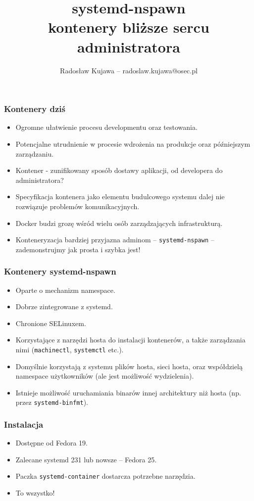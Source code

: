 \documentclass[dvipsnames,table]{beamer}
\title{systemd-nspawn \\ kontenery bliższe sercu administratora}
\author{Radosław Kujawa -- radoslaw.kujawa@osec.pl}
\institute{OSEC}
\begin{document}
\begin{frame}
	\titlepage
\end{frame}



\begin{frame}
\frametitle{Kontenery dziś}
\begin{itemize}
	\item Ogromne ułatwienie procesu developmentu oraz testowania.
	\item Potencjalne utrudnienie w procesie wdrożenia na produkcje oraz późniejszym zarządzaniu.
	\item Kontener - zunifikowany sposób dostawy aplikacji, od developera do administratora?
	\item Specyfikacja kontenera jako elementu budulcowego systemu dalej nie rozwiązuje problemów komunikacyjnych. 
	\item Docker budzi grozę wśród wielu osób zarządzających infrastrukturą.
	\item Konteneryzacja bardziej przyjazna adminom -- {\tt systemd-nspawn} -- zademonstrujmy jak prosta i szybka jest!
\end{itemize}
\end{frame}

\begin{frame}
\frametitle{Kontenery systemd-nspawn}
\begin{itemize}
	\item Oparte o mechanizm namespace.
	\item Dobrze zintegrowane z systemd.
	\item Chronione SELinuxem.
	\item Korzystające z narzędzi hosta do instalacji kontenerów, a także zarządzania nimi ({\tt machinectl}, {\tt systemctl} etc.).
	\item Domyślnie korzystają z systemu plików hosta, sieci hosta, oraz współdzielą namespace użytkowników (ale jest możliwość wydzielenia).
	\item Istnieje możliwość uruchamiania binarów innej architektury niż hosta (np. przez {\tt systemd-binfmt}).
\end{itemize}
\end{frame}

\begin{frame}
\frametitle{Instalacja}
\begin{itemize}
	\item Dostępne od Fedora 19.
	\item Zalecane systemd 231 lub nowsze -- Fedora 25.
	\item Paczka {\tt systemd-container} dostarcza potrzebne narzędzia.
	\item To wszystko! \Smiley
\end{itemize}
\end{frame}
\end{document}
